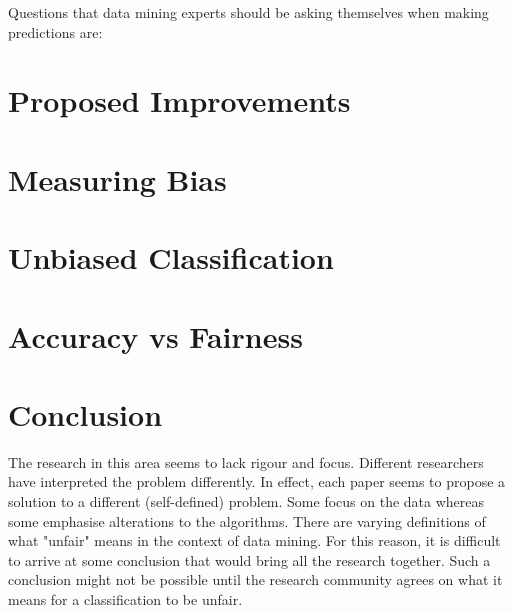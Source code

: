 \documentclass[a4paper, 12pt, titlepage]{article}
\begin{document}
Questions that data mining experts should be asking themselves when making predictions are:

\section*{Proposed Improvements}

\section*{Measuring Bias}

\section*{Unbiased Classification}

\section*{Accuracy vs Fairness}


\section*{Conclusion}

The research in this area seems to lack rigour and focus. Different researchers have interpreted the problem differently. In effect, each paper seems to propose a solution to a different (self-defined) problem. Some focus on the data whereas some emphasise alterations to the algorithms. There are varying definitions of what "unfair" means in the context of data mining. For this reason, it is difficult to arrive at some conclusion that would bring all the research together. Such a conclusion might not be possible until the research community agrees on what it means for a classification to be unfair.
\end{document}
